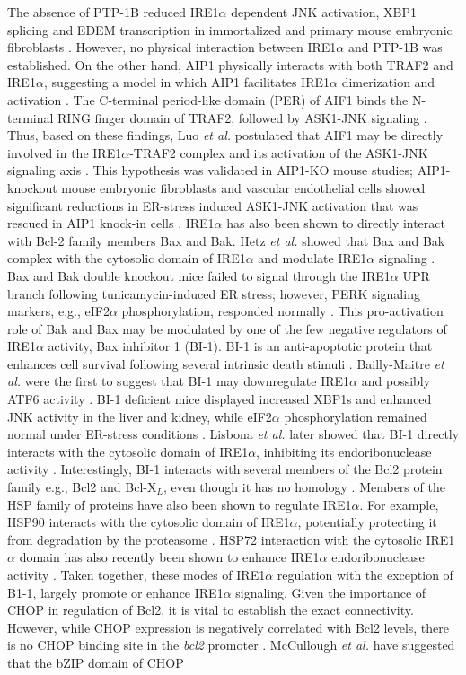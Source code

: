 \documentclass[12pt]{article}
\begin{document}
The absence of PTP-1B reduced IRE1$\alpha$ dependent JNK activation, XBP1 splicing and EDEM transcription in immortalized and primary mouse embryonic fibroblasts \cite{Gu:2004kx}. However, no physical interaction between IRE1$\alpha$ and PTP-1B was established. On the other hand, AIP1 physically interacts with both TRAF2 and IRE1$\alpha$, suggesting a model in which AIP1 facilitates IRE1$\alpha$ dimerization and activation \cite{Luo:2008ly}. The C-terminal period-like domain (PER) of AIF1 binds the N-terminal RING finger domain of TRAF2, followed by ASK1-JNK signaling \cite{Zhang:2004ve}. Thus, based on these findings, Luo \emph{et al.} postulated that AIF1 may be directly involved in the IRE1$\alpha$-TRAF2 complex and its activation of the ASK1-JNK signaling axis \cite{Luo:2008ly}. This hypothesis was validated in AIP1-KO mouse studies; AIP1-knockout mouse embryonic fibroblasts and vascular endothelial cells showed significant reductions in ER-stress induced ASK1-JNK activation that was rescued in AIP1 knock-in cells \cite{Luo:2008ly}. IRE1$\alpha$ has also been shown to directly interact with Bcl-2 family members Bax and Bak. Hetz \emph{et al.} showed that Bax and Bak complex with the cytosolic domain of IRE1$\alpha$ and modulate IRE1$\alpha$ signaling \cite{Hetz:2006qf}. Bax and Bak double knockout mice failed to signal through the IRE1$\alpha$ UPR branch following tunicamycin-induced ER stress; however, PERK signaling markers, e.g., eIF2$\alpha$ phosphorylation, responded normally \cite{Hetz:2006qf}. This pro-activation role of Bak and Bax may be modulated by one of the few negative regulators of IRE1$\alpha$ activity, Bax inhibitor 1 (BI-1). BI-1 is an anti-apoptotic protein that enhances cell survival following several intrinsic death stimuli \cite{Xu:1998dq}. Bailly-Maitre \emph{et al.} were the first to suggest that BI-1 may downregulate IRE1$\alpha$ and possibly ATF6 activity \cite{Bailly-Maitre:2006bh}. BI-1 deficient mice displayed increased XBP1s and enhanced JNK activity in the liver and kidney, while eIF2$\alpha$ phosphorylation remained normal under ER-stress conditions \cite{Bailly-Maitre:2006bh}. Lisbona \emph{et al.} later showed that BI-1 directly interacts with the cytosolic domain of IRE1$\alpha$, inhibiting its endoribonuclease activity \cite{Lisbona:2009cr}. Interestingly, BI-1 interacts with several members of the Bcl2 protein family e.g., Bcl2 and Bcl-X$_{L}$, even though it has no homology \cite{Xu:1998dq}. Members of the HSP family of proteins have also been shown to regulate IRE1$\alpha$. For example, HSP90 interacts with the cytosolic domain of IRE1$\alpha$, potentially protecting it from degradation by the proteasome \cite{Marcu:2002oq}. HSP72 interaction with the cytosolic IRE1$\alpha$ domain has also recently been shown to enhance IRE1$\alpha$ endoribonuclease activity \cite{Gupta:2010kl}. Taken together, these modes of IRE1$\alpha$ regulation with the exception of B1-1, largely promote or enhance IRE1$\alpha$ signaling. Given the importance of CHOP in regulation of Bcl2, it is vital to establish the exact connectivity. However, while CHOP expression is negatively correlated with Bcl2 levels, there is no CHOP binding site in the \emph{bcl2} promoter \cite{mccullough2001gsc}. McCullough \emph{et al.} have suggested that the bZIP domain of CHOP 
\end{document}
